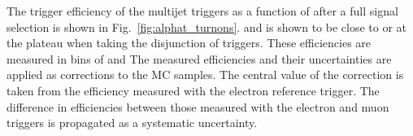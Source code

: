 


The trigger efficiency of the multijet triggers as a function of \mht after a full signal selection 
is shown in Fig.~\ref{fig:alphat_turnons}. %
and is shown to be close to or at the plateau when taking 
the disjunction of triggers. These efficiencies are measured in bins of \scalht and \mht
The measured
efficiencies and their uncertainties are applied as corrections to the MC
samples. The central value of the correction is taken from the efficiency
measured with the electron reference trigger. The difference in efficiencies between
those measured with the electron and muon triggers
is propagated as a systematic
uncertainty. 


